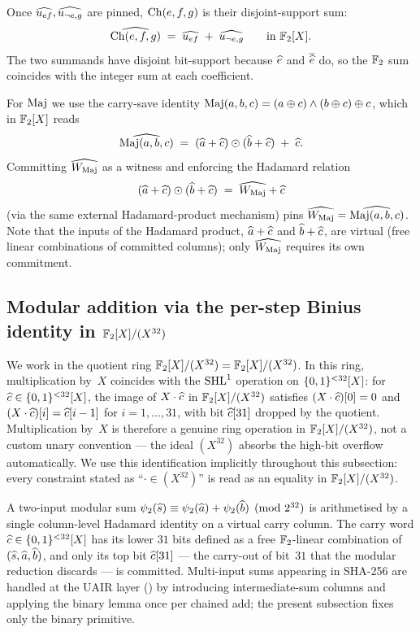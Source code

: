 Once $\widehat{u_{ef}}, \widehat{u_{\neg e, g}}$ are pinned, $\operatorname{Ch}(e,f,g)$ is
their disjoint-support sum:
\begin{equation}\label{eq:ch-decomp}
\widehat{\operatorname{Ch}(e,f,g)} \;=\; \widehat{u_{ef}} \;+\; \widehat{u_{\neg e,g}} \qquad \text{in } \mathbb{F}_2[X].
\end{equation}
The two summands have disjoint bit-support because $\widehat{e}$ and
$\overline{\widehat{e}}$ do, so the $\mathbb{F}_2$ sum coincides with the integer
sum at each coefficient.

For $\operatorname{Maj}$ we use the carry-save identity
$\operatorname{Maj}(a,b,c) = (a \oplus c) \wedge (b \oplus c) \oplus c$, which in
$\mathbb{F}_2[X]$ reads
\begin{equation}\label{eq:maj-identity}
\widehat{\operatorname{Maj}(a,b,c)} \;=\; (\widehat{a} + \widehat{c}) \odot (\widehat{b} + \widehat{c}) \;+\; \widehat{c}.
\end{equation}
Committing $\widehat{W_{\operatorname{Maj}}}$ as a witness and enforcing the Hadamard
relation
\begin{equation}\label{eq:maj-hadamard}
(\widehat{a} + \widehat{c}) \odot (\widehat{b} + \widehat{c}) \;=\; \widehat{W_{\operatorname{Maj}}} + \widehat{c}
\end{equation}
(via the same external Hadamard-product mechanism) pins
$\widehat{W_{\operatorname{Maj}}} = \widehat{\operatorname{Maj}(a,b,c)}$. Note that the inputs of the
Hadamard product, $\widehat{a}+\widehat{c}$ and $\widehat{b}+\widehat{c}$, are virtual
(free linear combinations of committed columns); only $\widehat{W_{\operatorname{Maj}}}$
requires its own commitment.

\subsection{Modular addition via the per-step Binius identity in
\texorpdfstring{$\mathbb{F}_2[X]/(X^{32})$}{F2[X]/(X\^{}32)}}\label{sec:mod-add}

We work in the quotient ring
$\mathbb{F}_2[X]/(X^{32}) = \mathbb{F}_2[X]/(X^{32})$. In this ring, multiplication by~$X$
coincides with the $\operatorname{SHL}^{1}$ operation on $\{0,1\}^{<32}[X]$: for
$\widehat{c} \in \{0,1\}^{<32}[X]$, the image of $X\cdot\widehat{c}$ in $\mathbb{F}_2[X]/(X^{32})$
satisfies $(X\cdot\widehat{c})[0] = 0$ and $(X\cdot\widehat{c})[i] = \widehat{c}[i-1]$
for $i = 1,\dots,31$, with bit $\widehat{c}[31]$ dropped by the quotient.
Multiplication by~$X$ is therefore a genuine ring operation in $\mathbb{F}_2[X]/(X^{32})$,
not a custom unary convention — the ideal $(X^{32})$ absorbs the
high-bit overflow automatically. We use this identification implicitly
throughout this subsection: every constraint stated as ``$\cdot \in
(X^{32})$'' is read as an equality in $\mathbb{F}_2[X]/(X^{32})$.

A two-input modular sum $\psi_2(\widehat{s}) \equiv \psi_2(\widehat{a}) +
\psi_2(\widehat{b}) \pmod{2^{32}}$ is arithmetised by a single column-level
Hadamard identity on a virtual carry column. The carry word $\widehat{c}
\in \{0,1\}^{<32}[X]$ has its lower $31$ bits defined as a free
$\mathbb{F}_2$-linear combination of $(\widehat{s}, \widehat{a}, \widehat{b})$, and only its
top bit $\widehat{c}[31]$ — the carry-out of bit~$31$ that the modular
reduction discards — is committed. Multi-input sums appearing in
SHA-256 are handled at the UAIR layer () by introducing
intermediate-sum columns and applying the binary lemma once per
chained add; the present subsection fixes only the binary primitive.

